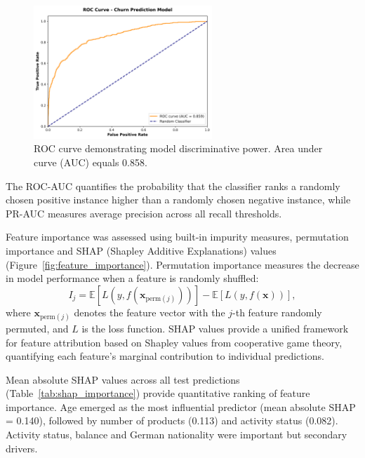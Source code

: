 \documentclass[12pt]{article}
\begin{document}
\begin{figure}[H]
\centering
\includegraphics[width=0.6\textwidth]{img/17_roc_curve.png}
\caption{ROC curve demonstrating model discriminative power. Area under curve (AUC) equals 0.858.}
\label{fig:roc_curve}
\end{figure}

The ROC-AUC quantifies the probability that the classifier ranks a randomly chosen positive instance higher than a randomly chosen negative instance, while PR-AUC measures average precision across all recall thresholds.

Feature importance was assessed using built‑in impurity measures, permutation importance and SHAP (Shapley Additive Explanations) values (Figure~\ref{fig:feature_importance}). Permutation importance measures the decrease in model performance when a feature is randomly shuffled:
\[ I_j = \mathbb{E}[L(y, f(\mathbf{x}_{\text{perm}(j)}))] - \mathbb{E}[L(y, f(\mathbf{x}))], \]
where \(\mathbf{x}_{\text{perm}(j)}\) denotes the feature vector with the \(j\)-th feature randomly permuted, and \(L\) is the loss function. SHAP values provide a unified framework for feature attribution based on Shapley values from cooperative game theory, quantifying each feature's marginal contribution to individual predictions.

Mean absolute SHAP values across all test predictions (Table~\ref{tab:shap_importance}) provide quantitative ranking of feature importance. Age emerged as the most influential predictor (mean absolute SHAP = 0.140), followed by number of products (0.113) and activity status (0.082). Activity status, balance and German nationality were important but secondary drivers.
\end{document}
